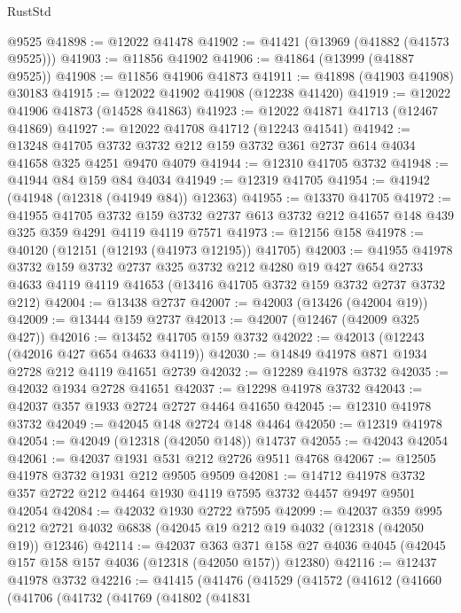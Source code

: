 \begin{lexlean}{RustStd}
\begin{coremodule}
    @9525
@41898 := @12022 @41478
@41902 := @41421 (@13969 (@41882 (@41573 @9525)))
@41903 := @11856 @41902
@41906 := @41864 (@13999 (@41887 @9525))
@41908 := @11856 @41906 @41873
@41911 := @41898 (@41903 @41908) @30183
@41915 := @12022 @41902 @41908 (@12238 @41420)
@41919 := @12022 @41906 @41873 (@14528 @41863)
@41923 := @12022 @41871 @41713 (@12467 @41869)
@41927 := @12022 @41708 @41712 (@12243 @41541)
@41942 := @13248
    @41705
    @3732
    @3732
    @212
    @159
    @3732
    @361
    @2737
    @614
    @4034
    @41658
    @325
    @4251
    @9470
    @4079
@41944 := @12310 @41705 @3732
@41948 := @41944 @84 @159 @84 @4034
@41949 := @12319 @41705
@41954 := @41942 (@41948 (@12318 (@41949 @84)) @12363)
@41955 := @13370 @41705
@41972 := @41955
    @41705
    @3732
    @159
    @3732
    @2737
    @613
    @3732
    @212
    @41657
    @148
    @439
    @325
    @359
    @4291
    @4119
    @4119
    @7571
@41973 := @12156 @158
@41978 := @40120 (@12151 (@12193 (@41973 @12195)) @41705)
@42003 := @41955
    @41978
    @3732
    @159
    @3732
    @2737
    @325
    @3732
    @212
    @4280
    @19
    @427
    @654
    @2733
    @4633
    @4119
    @4119
    @41653
    (@13416 @41705 @3732 @159 @3732 @2737 @3732 @212)
@42004 := @13438 @2737
@42007 := @42003 (@13426 (@42004 @19))
@42009 := @13444 @159 @2737
@42013 := @42007 (@12467 (@42009 @325 @427))
@42016 := @13452 @41705 @159 @3732
@42022 := @42013 (@12243 (@42016 @427 @654 @4633 @4119))
@42030 := @14849 @41978 @871 @1934 @2728 @212 @4119 @41651 @2739
@42032 := @12289 @41978 @3732
@42035 := @42032 @1934 @2728 @41651
@42037 := @12298 @41978 @3732
@42043 := @42037 @357 @1933 @2724 @2727 @4464 @41650
@42045 := @12310 @41978 @3732
@42049 := @42045 @148 @2724 @148 @4464
@42050 := @12319 @41978
@42054 := @42049 (@12318 (@42050 @148)) @14737
@42055 := @42043 @42054
@42061 := @42037 @1931 @531 @212 @2726 @9511 @4768
@42067 := @12505 @41978 @3732 @1931 @212 @9505 @9509
@42081 := @14712 @41978 @3732 @357 @2722 @212 @4464 @1930 @4119 @7595 @3732 @4457 @9497 @9501 @42054
@42084 := @42032 @1930 @2722 @7595
@42099 := @42037
    @359
    @995
    @212
    @2721
    @4032
    @6838
    (@42045 @19 @212 @19 @4032 (@12318 (@42050 @19)) @12346)
@42114 := @42037
    @363
    @371
    @158
    @27
    @4036
    @4045
    (@42045 @157 @158 @157 @4036 (@12318 (@42050 @157)) @12380)
@42116 := @12437 @41978 @3732
@42216 := @41415
    (@41476
      (@41529
        (@41572
          (@41612
            (@41660
              (@41706
                (@41732
                  (@41769
                    (@41802
                      (@41831

\end{coremodule}
\end{lexlean}
